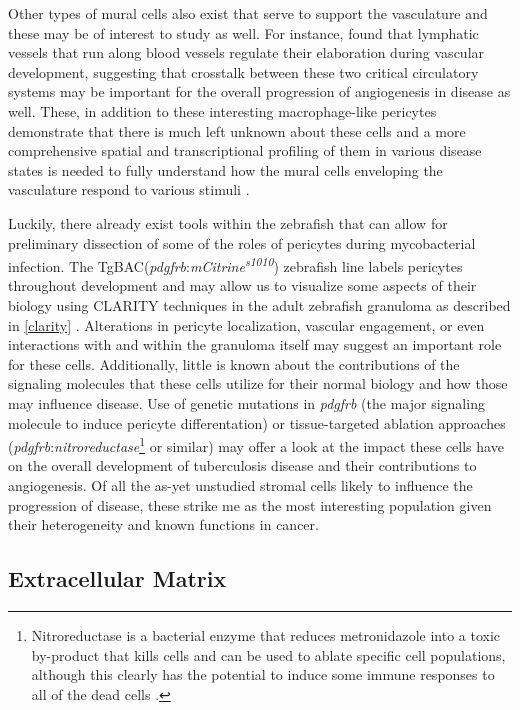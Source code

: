 Other types of mural cells also exist that serve to support the vasculature and these may be of interest to study as well. For instance, \citet{Bower2017b} found that lymphatic vessels that run along blood vessels regulate their elaboration during vascular development, suggesting that crosstalk between these two critical circulatory systems may be important for the overall progression of angiogenesis in disease as well. These, in addition to these interesting macrophage\hyp{}like pericytes demonstrate that there is much left unknown about these cells and a more comprehensive spatial and transcriptional profiling of them in various disease states is needed to fully understand how the mural cells enveloping the vasculature respond to various stimuli \citep{Yamazaki2018, Stark2013, Kozma2021, Balabanov1996}.

Luckily, there already exist tools within the zebrafish that can allow for preliminary dissection of some of the roles of pericytes during mycobacterial infection. The TgBAC(\textit{pdgfrb}:\textit{mCitrine\textsuperscript{s1010}}) zebrafish line labels pericytes throughout development and may allow us to visualize some aspects of their biology using CLARITY techniques in the adult zebrafish granuloma as described in \autoref{clarity} \citep{Vanhollebeke2015}. Alterations in pericyte localization, vascular engagement, or even interactions with and within the granuloma itself may suggest an important role for these cells. Additionally, little is known about the contributions of the signaling molecules that these cells utilize for their normal biology and how those may influence disease. Use of genetic mutations in \textit{pdgfrb} (the major signaling molecule to induce pericyte differentation) or tissue\hyp{}targeted ablation approaches (\textit{pdgfrb}:\textit{nitroreductase}\footnote{Nitroreductase is a bacterial enzyme that reduces metronidazole into a toxic by\hyp{}product that kills cells and can be used to ablate specific cell populations, although this clearly has the potential to induce some immune responses to all of the dead cells \citep{Sharrock2021}.} or similar) may offer a look at the impact these cells have on the overall development of tuberculosis disease and their contributions to angiogenesis. Of all the as\hyp{}yet unstudied stromal cells likely to influence the progression of disease, these strike me as the most interesting population given their heterogeneity and known functions in cancer.

\subsection{Extracellular Matrix}\label{ecm}

